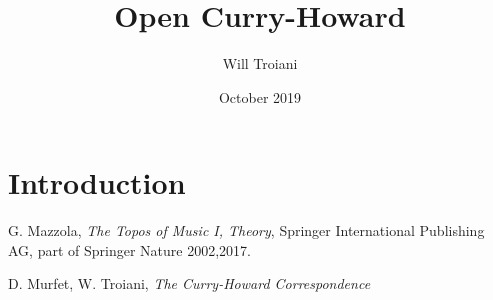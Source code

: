\documentclass[12pt]{article}
\title{Open Curry-Howard}
\author{Will Troiani}
\date{October 2019}
\numberwithin{thm}{subsection}
\numberwithin{defn}{subsection}
\numberwithin{lemma}{subsection}
\numberwithin{example}{subsection}
\numberwithin{notation}{subsection}
\numberwithin{cor}{subsection}
\numberwithin{remark}{subsection}
\numberwithin{condition}{subsection}
\numberwithin{question}{subsection}
\numberwithin{question}{subsection}
\begin{document}
 \section{Introduction}
 
 
 \begin{thebibliography}{9}
  G. Mazzola, \emph{The Topos of Music I, Theory}, Springer International Publishing AG, part of Springer Nature 2002,2017.
 
  D. Murfet, W. Troiani, \emph{The Curry-Howard Correspondence}
 \end{thebibliography}
 
 
\end{document}
